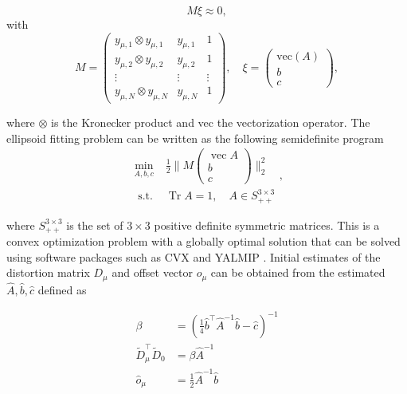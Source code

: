 \begin{equation}
	M \xi \approx 0,
\end{equation}
with
\begin{equation}
	M=\left(\begin{array}{ccc}
		y_{\mu, 1} \otimes y_{\mu, 1} & y_{\mu, 1} & 1 \\
		y_{\mu, 2} \otimes y_{\mu, 2} & y_{\mu, 2} & 1 \\
		\vdots & \vdots & \vdots \\
		y_{\mu, N} \otimes y_{\mu, N} & y_{\mu, N} & 1
	\end{array}\right), \quad \xi=\left(\begin{array}{c}
		\mathrm{vec} (A) \\
		b \\
		c
	\end{array}\right),
\end{equation}

where $\otimes$ is the Kronecker product and vec the vectorization operator.
The ellipsoid fitting problem can be written as the following semidefinite program \cite{Kok2016} 
\begin{equation}
	\begin{array}{ll}
		\min _{A, b, c} & \frac{1}{2}\|M\left(\begin{array}{c}
			\operatorname{vec} A \\
			b \\
			c
		\end{array}\right)\|_{2}^{2} \\
		\text { s.t. } & \operatorname{Tr} A=1, \quad A \in S_{++}^{3 \times 3}
	\end{array},
\end{equation}

where $S_{++}^{3 \times 3}$ is the set of $3 \times 3$ positive definite symmetric matrices. This is a convex optimization problem with a globally optimal solution that can be solved using software packages such as CVX \cite{cvx} and YALMIP \cite{Lofberg2004}. Initial estimates of the distortion matrix $D_\mu$ and offset vector $o_\mu$ can be obtained from the estimated $\widehat{A}, \widehat{b}, \widehat{c}$ defined as

\begin{subequations}
	\begin{align}
		\beta &=\left(\frac{1}{4} \hat{b}^{\top} \widehat{A}^{-1} \widehat{b}-\widehat{c}\right)^{-1} \\
		\widetilde{D}_{\mu}^{\top} \widetilde{D}_{0} &=\beta \widehat{A}^{-1} \\
		\widehat{o}_{\mu} &=\frac{1}{2} \widehat{A}^{-1} \widehat{b}
	\end{align}
\end{subequations}

